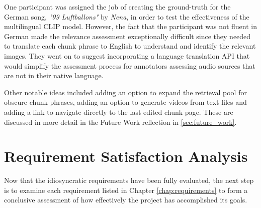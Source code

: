 \documentclass{l4proj}
\begin{document}
One participant was assigned the job of creating the ground-truth for the German song, \emph{"99 Luftballons"} by \emph{Nena}, in order to test the effectiveness of the multilingual CLIP model. However, the fact that the participant was not fluent in German made the relevance assessment exceptionally difficult since they needed to translate each chunk phrase to English to understand and identify the relevant images. They went on to suggest incorporating a language translation API that would simplify the assessment process for annotators assessing audio sources that are not in their native language.

Other notable ideas included adding an option to expand the retrieval pool for obscure chunk phrases, adding an option to generate videos from text files and adding a link to navigate directly to the last edited chunk page. These are discussed in more detail in the Future Work reflection in \ref{sec:future_work}.


\section{Requirement Satisfaction Analysis}
Now that the idiosyncratic requirements have been fully evaluated, the next step is to examine each requirement listed in Chapter \ref{chap:requirements} to form a conclusive assessment of how effectively the project has accomplished its goals.
\end{document}
